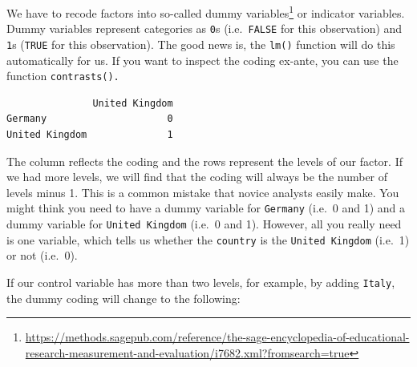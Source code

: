 \documentclass[
  letterpaper,
]{krantz}
\makeatletter
\newenvironment{Shaded}{\begin{snugshade}}{\end{snugshade}}
\newcommand{\FunctionTok}[1]{\textcolor[rgb]{0.28,0.35,0.67}{#1}}
\newcommand{\NormalTok}[1]{\textcolor[rgb]{0.00,0.23,0.31}{#1}}
\newcommand{\OtherTok}[1]{\textcolor[rgb]{0.00,0.23,0.31}{#1}}
\newcommand{\SpecialCharTok}[1]{\textcolor[rgb]{0.37,0.37,0.37}{#1}}
\newcommand{\StringTok}[1]{\textcolor[rgb]{0.13,0.47,0.30}{#1}}
\renewcommand{\href}[2]{#2\footnote{\url{#1}}}
\newenvironment{kframe}{%
\medskip{}
\setlength{\fboxsep}{.8em}
 \def\at@end@of@kframe{}%
 \ifinner\ifhmode%
  \def\at@end@of@kframe{\end{minipage}}%
  \begin{minipage}{\columnwidth}%
 \fi\fi%
 \def\FrameCommand##1{\hskip\@totalleftmargin \hskip-\fboxsep
 \colorbox{shadecolor}{##1}\hskip-\fboxsep
     \hskip-\linewidth \hskip-\@totalleftmargin \hskip\columnwidth}%
 \MakeFramed {\advance\hsize-\width
   \@totalleftmargin\z@ \linewidth\hsize
   \@setminipage}}%
 {\par\unskip\endMakeFramed%
 \at@end@of@kframe}
\renewenvironment{Shaded}{\begin{kframe}}{\end{kframe}}
\makeatother
\begin{document}
We have to recode factors into so-called
\href{https://methods.sagepub.com/reference/the-sage-encyclopedia-of-educational-research-measurement-and-evaluation/i7682.xml?fromsearch=true}{dummy
variables} or indicator variables. Dummy variables represent categories
as \texttt{0}s (i.e.~\texttt{FALSE} for this observation) and
\texttt{1}s (\texttt{TRUE} for this observation). The good news is, the
\texttt{lm()} function will do this automatically for us. If you want to
inspect the coding ex-ante, you can use the function
\texttt{contrasts().}

\begin{Shaded}
\end{Shaded}

\begin{verbatim}
               United Kingdom
Germany                     0
United Kingdom              1
\end{verbatim}

The column reflects the coding and the rows represent the levels of our
factor. If we had more levels, we will find that the coding will always
be the number of levels minus 1. This is a common mistake that novice
analysts easily make. You might think you need to have a dummy variable
for \texttt{Germany} (i.e.~0 and 1) and a dummy variable for
\texttt{United\ Kingdom} (i.e.~0 and 1). However, all you really need is
one variable, which tells us whether the \texttt{country} is the
\texttt{United\ Kingdom} (i.e.~1) or not (i.e.~0).

If our control variable has more than two levels, for example, by adding
\texttt{Italy}, the dummy coding will change to the following:

\begin{Shaded}
\end{Shaded}
\end{document}
